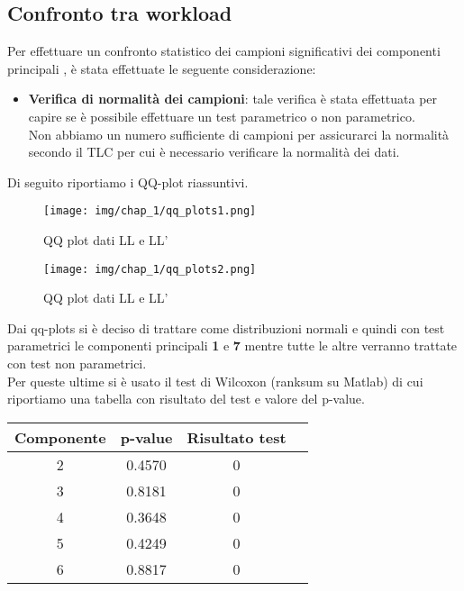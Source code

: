 \subsection{Confronto tra workload}
Per effettuare un confronto statistico dei campioni significativi dei componenti principali , è stata effettuate le seguente considerazione:
\begin{itemize}
    \item \textbf{Verifica di normalità dei campioni}: tale verifica è stata effettuata per capire se è possibile effettuare un test parametrico o non parametrico.\\
    Non abbiamo un numero sufficiente di campioni per assicurarci la normalità secondo il TLC per cui è necessario verificare la normalità dei dati.
\end{itemize}
Di seguito riportiamo i QQ-plot riassuntivi.\\
\begin{figure}[H]
    \centering
    \texttt{[image: img/chap\_1/qq\_plots1.png]}
    \caption{QQ plot dati LL e LL'}
    \label{fig:qq_plot_ll1}
\end{figure}
\noindent
\begin{figure}[H]
    \centering
    \texttt{[image: img/chap\_1/qq\_plots2.png]}
    \caption{QQ plot dati LL e LL'}
    \label{fig:qq_plot_ll2}
\end{figure}
\noindent
Dai qq-plots si è deciso di trattare come distribuzioni normali e quindi con test parametrici le componenti principali \textbf{1} e \textbf{7} mentre tutte le altre verranno trattate con test non parametrici.\\
Per queste ultime si è usato il test di Wilcoxon (ranksum su Matlab) di cui riportiamo una tabella con risultato del test e valore del p-value.
\begin{table}[htbp]
    \centering
    \label{tab:esempio}
    \begin{tabular}{|c|c|c|c|} %
        \hline
        Componente & p-value & Risultato test \\ %
        \hline
        2 & 0.4570 & 0 \\
        3 & 0.8181 & 0 \\
        4 & 0.3648 & 0\\
        5 & 0.4249 & 0\\
        6 & 0.8817 & 0\\
        \hline
    \end{tabular}
\end{table}
